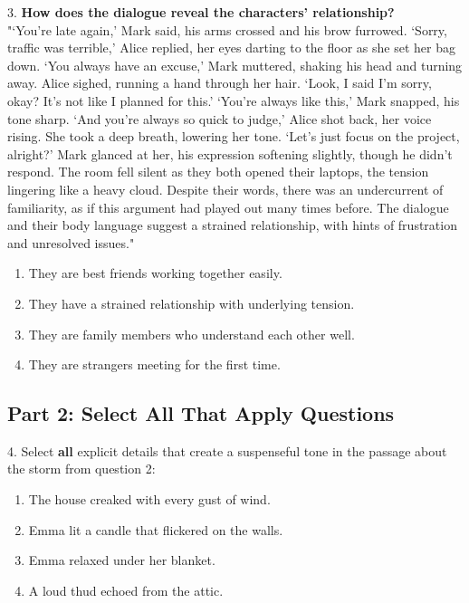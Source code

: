 \documentclass[12pt]{article}
\begin{document}
3. \textbf{How does the dialogue reveal the characters' relationship?\\}
"‘You’re late again,’ Mark said, his arms crossed and his brow furrowed.  
‘Sorry, traffic was terrible,’ Alice replied, her eyes darting to the floor as she set her bag down.  
‘You always have an excuse,’ Mark muttered, shaking his head and turning away.  
Alice sighed, running a hand through her hair. ‘Look, I said I’m sorry, okay? It’s not like I planned for this.’  
‘You’re always like this,’ Mark snapped, his tone sharp.  
‘And you’re always so quick to judge,’ Alice shot back, her voice rising. She took a deep breath, lowering her tone. ‘Let’s just focus on the project, alright?’  
Mark glanced at her, his expression softening slightly, though he didn’t respond.  
The room fell silent as they both opened their laptops, the tension lingering like a heavy cloud. Despite their words, there was an undercurrent of familiarity, as if this argument had played out many times before. The dialogue and their body language suggest a strained relationship, with hints of frustration and unresolved issues."  
\begin{enumerate}[label=\Alph*.]
    \item They are best friends working together easily.  
    \item They have a strained relationship with underlying tension.  
    \item They are family members who understand each other well.  
    \item They are strangers meeting for the first time.  
\end{enumerate}

\vspace{1cm}

\subsection*{Part 2: Select All That Apply Questions}

4. Select \textbf{all} explicit details that create a suspenseful tone in the passage about the storm from question 2:  
\begin{enumerate}[label=\Alph*.]
    \item The house creaked with every gust of wind.  
    \item Emma lit a candle that flickered on the walls.  
    \item Emma relaxed under her blanket.  
    \item A loud thud echoed from the attic.  
\end{enumerate}
\end{document}
